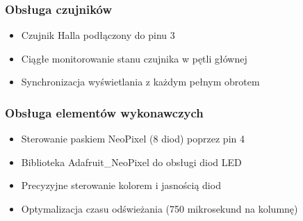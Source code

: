 \documentclass{article}
\begin{document}
\subsubsection{Obsługa czujników}
\begin{itemize}
    \item Czujnik Halla podłączony do pinu 3
    \item Ciągłe monitorowanie stanu czujnika w pętli głównej
    \item Synchronizacja wyświetlania z każdym pełnym obrotem
\end{itemize}

\subsubsection{Obsługa elementów wykonawczych}
\begin{itemize}
    \item Sterowanie paskiem NeoPixel (8 diod) poprzez pin 4
    \item Biblioteka Adafruit\_NeoPixel do obsługi diod LED
    \item Precyzyjne sterowanie kolorem i jasnością diod
    \item Optymalizacja czasu odświeżania (750 mikrosekund na kolumnę)
\end{itemize}
\end{document}
